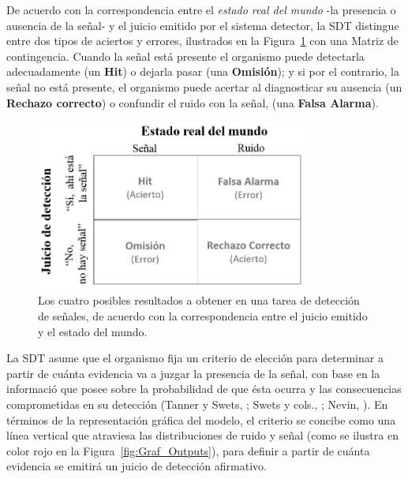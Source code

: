 De acuerdo con la correspondencia entre el \textit{estado real del mundo} -la presencia o ausencia de la señal- y el juicio emitido por el sistema detector, la SDT distingue entre dos tipos de aciertos y errores, ilustrados en la Figura~\ref{fig:Mat_Output} con una Matriz de contingencia. Cuando la señal está presente el organismo puede detectarla adecuadamente (un \textbf{Hit}) o dejarla pasar (una \textbf{Omisión}); y si por el contrario, la señal no está presente, el organismo puede acertar al diagnosticar su ausencia (un \textbf{Rechazo correcto}) o confundir el ruido con la señal, (una \textbf{Falsa Alarma}).\\

\begin{figure}[th]
\centering
\includegraphics[width=0.80\textwidth]{Figures/Matriz_Outputs} 
\caption[Matriz de contingencia: Resultados a obtener en una tarea de detección]{Los cuatro posibles resultados a obtener en una tarea de detección de señales, de acuerdo con la correspondencia entre el juicio emitido y el estado del mundo.}
\label{fig:Mat_Output}
\end{figure}

La SDT asume que el organismo fija un criterio de elección para determinar a partir de cuánta evidencia va a juzgar la presencia de la señal, con base en la informació que posee sobre la probabilidad de que ésta ocurra y las consecuencias comprometidas en su detección (Tanner y Swets, \citeyear{Tanner1954}; Swets y cols., \citeyear{Swets1961}; Nevin, \citeyear{Nevin1969}). En términos de la representación gráfica del modelo, el criterio se concibe como una línea vertical que atraviesa las distribuciones de ruido y señal (como se ilustra en color rojo en la Figura~\ref{fig:Graf_Outputs}), para definir a partir de cuánta evidencia se emitirá un juicio de detección afirmativo.\\

